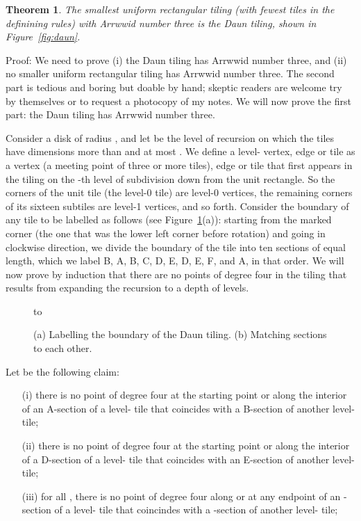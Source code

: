 \documentclass[11pt,a4paper]{article}
\newtheorem{theorem}{Theorem}
\newenvironment{proof}{Proof:}{\qed}
\def\squareforqed{\hbox{\rlap{}}}
\def\qed{\ifmmode\squareforqed\else{\unskip\nobreak\hfil
\penalty50\hskip1em\null\nobreak\hfil\squareforqed
\parfillskip=0pt\finalhyphendemerits=0\endgraf}\fi}
\begin{document}
\begin{theorem}\label{th:Dauntiling}
The smallest uniform rectangular tiling (with fewest tiles in the definining rules) with Arrwwid number three is the Daun tiling, shown in Figure~\ref{fig:daun}.
\end{theorem}
\begin{proof}
We need to prove (i) the Daun tiling has Arrwwid number three, and (ii) no smaller uniform rectangular tiling has Arrwwid number three. The second part is tedious and boring but doable by hand; skeptic readers are welcome try by themselves or to request a photocopy of my notes. We will now prove the first part: the Daun tiling has Arrwwid number three.

Consider a disk  of radius , and let  be the level of recursion on which the tiles have dimensions more than  and at most . We define a level- vertex, edge or tile as a vertex (a meeting point of three or more tiles), edge or tile that first appears in the tiling on the -th level of subdivision down from the unit rectangle. So the corners of the unit tile (the level-0 tile) are level-0 vertices, the remaining corners of its sixteen subtiles are level-1 vertices, and so forth. Consider the boundary of any tile to be labelled as follows (see Figure~\ref{fig:daun-labelling}(a)): starting from the marked corner (the one that was the lower left corner before rotation) and going in clockwise direction, we divide the boundary of the tile into ten sections of equal length, which we label B, A, B, C, D, E, D, E, F, and A, in that order. We will now prove by induction that there are no points of degree four in the tiling  that results from expanding the recursion to a depth of  levels.
\begin{figure}
\centering
\hbox to
\caption{(a) Labelling the boundary of the Daun tiling. (b) Matching sections to each other.}
\label{fig:daun-labelling}
\end{figure}
Let  be the following claim:\begin{itemize}
\item[(i)] there is no point of degree four at the starting point or along the interior of an A-section of a level- tile that coincides with a B-section of another level- tile;
\item[(ii)] there is no point of degree four at the starting point or along the interior of a D-section of a level- tile that coincides with an E-section of another level- tile;
\item[(iii)] for all , there is no point of degree four along or at any endpoint of an -section of a level- tile that coincindes with a -section of another level- tile;

\end{itemize}
\end{proof}
\end{document}
